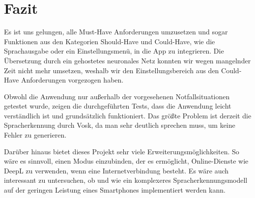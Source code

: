 \newpage
\section{Fazit}\label{sec:conclusion}
Es ist uns gelungen, alle Must-Have Anforderungen umzusetzen und sogar Funktionen aus den Kategorien Should-Have und Could-Have, wie die Sprachausgabe oder ein Einstellungsmenü, in die App zu integrieren. Die Übersetzung durch ein gehostetes neuronales Netz konnten wir wegen mangelnder Zeit nicht mehr umsetzen, weshalb wir den Einstellungsbereich aus den Could-Have Anforderungen vorgezogen haben.

Obwohl die Anwendung nur außerhalb der vorgesehenen Notfallsituationen getestet wurde, zeigen die durchgeführten Tests, dass die Anwendung leicht verständlich ist und grundsätzlich funktioniert. 
Das größte Problem ist derzeit die Spracherkennung durch Vosk, da man sehr deutlich sprechen muss, um keine Fehler zu generieren.

Darüber hinaus bietet dieses Projekt sehr viele Erweiterungsmöglichkeiten. So wäre es sinnvoll, einen Modus einzubinden, der es ermöglicht, Online-Dienste wie DeepL zu verwenden, wenn eine Internetverbindung besteht. Es wäre auch interessant zu untersuchen, ob und wie ein komplexeres Spracherkennungsmodell auf der geringen Leistung eines Smartphones implementiert werden kann.